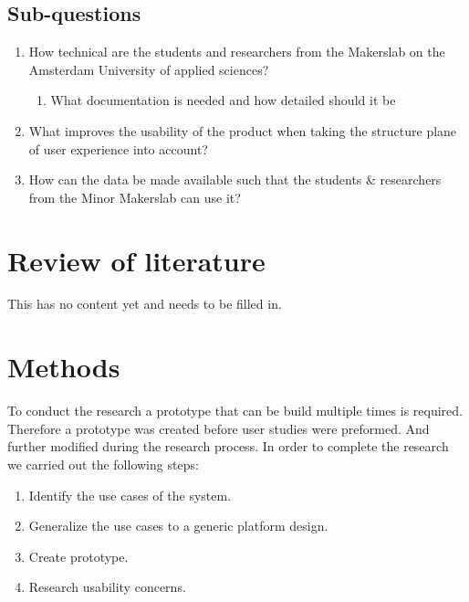 \documentclass[conference]{IEEEtran}
\begin{document}
\subsection{Sub-questions}
\begin{enumerate}
\item How technical are the students and researchers from the Makerslab on the Amsterdam University of applied sciences?
\begin{enumerate}
\item What documentation is needed and how detailed should it be
\end{enumerate}
\item What improves the usability of the product when taking the structure plane of user experience into account?
\item How can the data be made available such that the students \& researchers from the Minor Makerslab can use it?
\end{enumerate}

\section{Review of literature}
This has no content yet and needs to be filled in. 

\section{Methods}
	To conduct the research a prototype that can be build multiple times is required. Therefore a prototype was created before user studies were preformed. And further modified during the research process. In order to complete the research we carried out the following steps:
	\begin{enumerate}
		\item Identify the use cases of the system.
		\item Generalize the use cases to a generic platform design.
		\item Create prototype.
		\item Research usability concerns.
	\end{enumerate}
\end{document}
